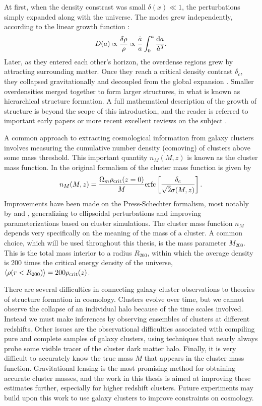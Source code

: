 At first, when the density constrast was small $\delta(x) \ll 1$, the perturbations simply expanded along with the universe. The modes grew independently, according to the linear growth function \citep{Voit05}:
\begin{equation}
D(a) \propto \frac{\delta \rho}{\rho} \propto \frac{\dot{a}}{a} \int_0^a \frac{{\rm d}a}{\dot{a}^3}.
\end{equation}
Later, as they entered each other's horizon, the overdense regions grew by attracting surrounding matter. Once they reach a critical density contrast $\delta_c$, they collapsed gravitationally and decoupled from the global expansion \citep{Schneider06_IntroGravLensCosmology}. Smaller overdensities merged together to form larger structures, in what is known as hierarchical structure formation. A full mathematical description of the growth of structure is beyond the scope of this introduction,  and the reader is referred to important early papers \citep[e.g.][]{PS74,GottRees75} or more recent excellent reviews on the subject \citep[e.g.][]{Voit05,Schneider06_IntroGravLensCosmology,Kravtsov12}. 

A common approach to extracting cosmological information from galaxy clusters involves measuring the cumulative number density (comoving) of clusters above some mass threshold.  This important quantity $n_M (M,z)$ is known as the cluster mass function. In the original formalism of \citet{PS74} the cluster mass function is given by
\begin{equation}
n_M (M,z) = \frac{\Omega_m \rho_{\rm crit}(z=0)}{M} {\rm erfc}\left[ \frac{\delta_c}{\sqrt{2}\sigma(M,z)} \right].
\end{equation}
Improvements have been made on the Press-Schechter formalism, most notably by \citet{Sheth99} and \citet{Jenkins01}, generalizing to ellipsoidal perturbations and improving parameterizations based on cluster simulations. The cluster mass function $n_M$ depends very specifically on the meaning of the mass of a cluster. A common choice, which will be used throughout this thesis, is the mass parameter $M_{200}$. This is the total mass interior to a radius $R_{200}$, within which the average density is 200 times the critical energy density of the universe, $\langle \rho (r<R_{200}) \rangle = 200 \rho_{\rm crit}(z)$.

There are several difficulties in connecting galaxy cluster observations to theories of structure formation in cosmology. Clusters evolve over time, but we cannot observe the collapse of an individual halo because of the time scales involved. Instead we must make inferences by observing ensembles of clusters at different redshifts. Other issues are the observational difficulties associated with compiling pure and complete samples of galaxy clusters, using techniques that nearly always probe some visible tracer of the cluster dark matter halo. Finally, it is very difficult to accurately know the true mass $M$ that appears in the cluster mass function. Gravitational lensing is the most promising method for obtaining accurate cluster masses, and the work in this thesis is aimed at improving these estimates further, especially for higher redshift clusters. Future experiments may build upon this work to use galaxy clusters to improve constraints on cosmology.

